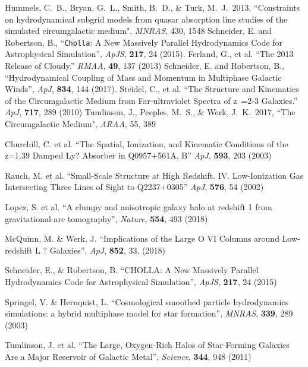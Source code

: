 \documentclass[11pt,letterpaper,english]{article}
\begin{document}
{\begin{thebibliography}{500}
 Hummels, C.~B., Bryan, G.~L., Smith, B.~D., \& Turk, M.~J.\ 2013,  ``Constraints on hydrodynamical subgrid models from quasar absorption line studies of the simulated circumgalactic medium", {\em MNRAS}, 430, 1548 
 Schneider, E. and Robertson, B., ``{\tt Cholla}: A New Massively Parallel Hydrodynamics Code for Astrophysical Simulation'', {\em ApJS}, {\bf 217}, 24 (2015).
\vspace{-.09in}
 Ferland, G., et al. ``The 2013 Release of Cloudy.'' {\em RMAA}, {\bf 49}, 137 (2013)
\vspace{-.09in}
 Schneider, E. and Robertson, B., ``Hydrodynamical Coupling of Mass and Momentum in Multiphase Galactic Winds'', {\em ApJ}, {\bf 834}, 144 (2017).
\vspace{-.09in}
 Steidel, C., et al. ``The Structure and Kinematics of the Circumgalactic Medium from Far-ultraviolet Spectra of z~=2-3 Galaxies.'' {\em ApJ}, {\bf 717}, 289 (2010)
 Tumlinson, J., Peeples, M.~S., \& Werk, J.~K.\ 2017,  ``The Circumgalactic Medium", {\em ARAA}, 55, 389 

 Churchill, C. et al. ``The Spatial, Ionization, and Kinematic Conditions of the z=1.39 Damped Ly? Absorber in Q0957+561A, B'' {\em ApJ}, {\bf 593}, 203 (2003) 

 Rauch, M. et al.  ``Small-Scale Structure at High Redshift. IV. Low-Ionization Gas Intersecting Three Lines of Sight to Q2237+0305'' {\em ApJ}, {\bf 576}, 54 (2002)

 Lopez, S. et al. ``A clumpy and anisotropic galaxy halo at redshift 1 from gravitational-arc tomography'', {\em Nature}, {\bf 554}, 493 (2018)

 McQuinn, M. \& Werk, J. ``Implications of the Large O VI Columns around Low-redshift L ? Galaxies'', {\em ApJ}, {\bf 852}, 33, (2018)

 Schneider, E., \& Robertson, B. ``CHOLLA: A New Massively Parallel Hydrodynamics Code for Astrophysical Simulation'', {\em ApJS}, {\bf 217}, 24 (2015)

 Springel, V. \& Hernquist, L. ``Cosmological smoothed particle hydrodynamics simulations: a hybrid multiphase model for star formation'', {\em MNRAS}, {\bf 339}, 289 (2003)

 Tumlinson, J. et al. ``The Large, Oxygen-Rich Halos of Star-Forming Galaxies Are a Major Reservoir of Galactic Metal'', {\em Science}, {\bf 344}, 948 (2011)


\end{thebibliography}}
\end{document}
